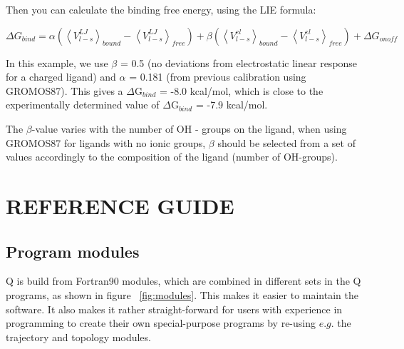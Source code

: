 \documentclass[a4paper,11pt]{article}
\let\origcite\cite
\def\cite#1{\unskip~\origcite{#1}}
\let\origref\ref
\def\ref#1{\unskip~\origref{#1}}
\begin{document}


Then you can calculate the binding free energy, using the LIE
formula:

\begin {equation}
\label{eq:LIE} \Delta G_{bind} = \alpha \left( {\left\langle
{V_{l-s}^{LJ}} \right\rangle_{bound} - \left\langle {V_{l-s}^{LJ}}
\right\rangle_{free}} \right) + \beta\left( {\left\langle
{V_{l-s}^{el}} \right\rangle_{bound} - \left\langle {V_{l-s}^{el}}
\right\rangle_{free}} \right) + \Delta G_{onoff}
\end{equation}

In this example, we use $\beta $ = 0.5 (no deviations from
electrostatic linear response for a charged ligand) and $\alpha $
= 0.181 (from previous calibration using GROMOS87). This gives a
$\Delta $G$_{bind}$ = -8.0 kcal/mol, which is close to the
experimentally determined value of $\Delta $G$_{bind}$ = -7.9
kcal/mol.

The $\beta $-value varies with the number of OH - groups on the
ligand, when using GROMOS87 for ligands with no ionic groups,
$\beta $ should be selected from a set of values accordingly to
the composition of the ligand (number of
OH-groups).\cite{Hansson1998}


\section{REFERENCE GUIDE}
\subsection{Program modules}
Q is  build from  Fortran90 modules, which  are combined  in different
sets in  the Q  programs, as shown  in figure  \ref{fig:modules}. This
makes it  easier to  maintain the  software. It  also makes  it rather
straight-forward for  users with  experience in programming  to create
their own  special-purpose programs by re-using  $e.g.$ the trajectory
and topology modules.
\end{document}
